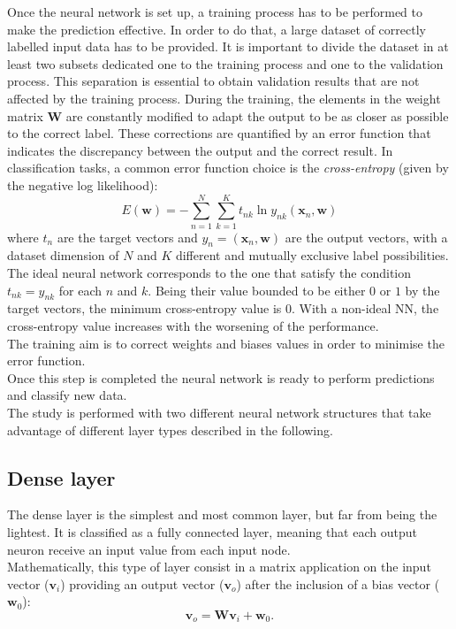 Once the neural network is set up, a training process has to be performed to make the prediction effective. In order to do that, a large dataset of correctly labelled input data has to be provided. It is important to divide the dataset in at least two subsets dedicated one to the training process and one to the validation process. This separation is essential to obtain validation results that are not affected by the training process.
During the training, the elements in the weight matrix $\bm{W}$ are constantly modified to adapt the output to be as closer as possible to the correct label. These corrections are quantified by an error function that indicates the discrepancy between the output and the correct result. In classification tasks, a common error function choice is the \textit{cross-entropy} (given by the negative log likelihood):
\begin{equation}\label{eq:err_func}
    E(\bm{w}) = -\sum_{n=1}^N\sum_{k=1}^K t_{nk}\ln{y_{nk}(\bm{x}_n,\bm{w})}
\end{equation}
where $t_n$ are the target vectors and $y_n=(\bm{x}_n,\bm{w})$ are the output vectors, with a dataset dimension of $N$ and $K$ different and mutually exclusive label possibilities.\\
The ideal neural network corresponds to the one that satisfy the condition $t_{nk} = y_{nk}$ for each $n$ and $k$. Being their value bounded to be either $0$ or $1$ by the target vectors, the minimum cross-entropy value is $0$. With a non-ideal NN, the cross-entropy value increases with the worsening of the performance.\\  
The training aim is to correct weights and biases values in order to minimise the error function.\\
Once this step is completed the neural network is ready to perform predictions and classify new data.\\

The study is performed with two different neural network structures that take advantage of different layer types described in the following.

\subsection*{Dense layer}
The dense layer is the simplest and most common layer, but far from being the lightest. It is classified as a fully connected layer, meaning that each output neuron receive an input value from each input node.\\
Mathematically, this type of layer consist in a matrix application on the input vector ($\bm{v}_i$) providing an output vector ($\bm{v}_o$) after the inclusion of a bias vector ($\bm{w}_0$):
\begin{equation}
    \bm{v}_o = \bm{W}\bm{v}_i+\bm{w}_0.
\end{equation}


